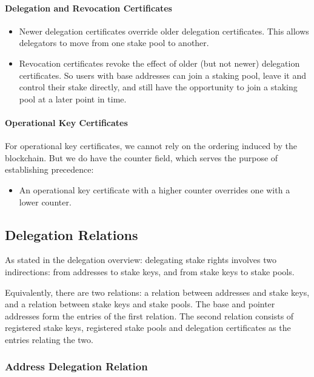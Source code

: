 \documentclass[11pt,a4paper]{article}
\begin{document}
\paragraph{Delegation and Revocation Certificates}
\label{delegation-and-revocation-certificates}

\begin{itemize}
\item
  Newer delegation certificates override older delegation
  certificates. This allows delegators to move from one stake pool to
  another.
\item
  Revocation certificates revoke the effect of older (but not newer)
  delegation certificates. So users with base addresses can join a
  staking pool, leave it and control their stake directly, and still
  have the opportunity to join a staking pool at a later point in time.
\end{itemize}

\paragraph{Operational Key Certificates}
\label{operational-key-certificates-1}

For operational key certificates, we cannot rely on the ordering induced by
the blockchain. But we do have the counter field, which serves the
purpose of establishing precedence:

\begin{itemize}
\item
  An operational key certificate with a higher counter overrides one with a
  lower counter.
\end{itemize}

\subsection{Delegation Relations}
\label{delegation-relations}

As stated in the delegation overview: delegating stake rights involves
two indirections: from addresses to stake keys, and from stake keys to
stake pools.

Equivalently, there are two relations: a relation between addresses and
stake keys, and a relation between stake keys and stake pools. The base
and pointer addresses form the entries of the first relation. The second
relation consists of registered stake keys, registered stake pools and
delegation certificates as the entries relating the two.

\subsubsection{Address Delegation Relation}
\label{address-delegation-relation}
\end{document}
